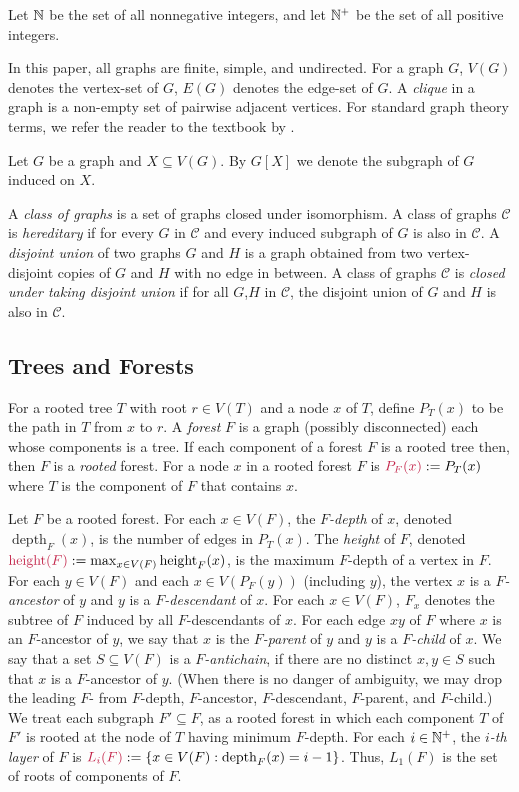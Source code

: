 \documentclass{patmorin}
\makeatletter
\newcommand{\defin}[1]{\emph{\textcolor{brightmaroon}{#1}}}
\def\mathcolor#1#{\@mathcolor{#1}}
\def\@mathcolor#1#2#3{%
  \protect\leavevmode
  \begingroup
    \color#1{#2}#3%
  \endgroup
}
\newcommand{\mathdefin}[1]{\mathcolor{brightmaroon}{#1}}
\DeclareMathOperator{\height}{height}
\DeclareMathOperator{\depth}{depth}
\newcommand{\calC}{\mathcal{C}}
\makeatother
\begin{document}
Let \defin{$\mathbb{N}$} be the set of all nonnegative integers, and let \defin{$\mathbb{N}^+$} be the set of all positive integers.

  In this paper, all graphs are finite, simple, and undirected.  For a graph $G$, \defin{$V(G)$} denotes the vertex-set of $G$, \defin{$E(G)$} denotes the edge-set of $G$.  A \defin{clique} in a graph is a non-empty set of pairwise adjacent vertices. For standard graph theory terms, we refer the reader to the textbook by \citet{diestel:graph}.

  Let $G$ be a graph and $X\subseteq V(G)$. By $G[X]$ we denote the subgraph of $G$ induced on $X$.

  A \defin{class of graphs} is a set of graphs closed under isomorphism.
  A class of graphs $\calC$ is \defin{hereditary} if for every $G$ in $\calC$ and every induced subgraph of $G$ is also in $\calC$.
  A \defin{disjoint union} of two graphs $G$ and $H$ is a graph obtained from two vertex-disjoint copies of $G$ and $H$ with no edge in between.
  A class of graphs $\calC$ is \defin{closed under taking disjoint union} if for all $G$,$H$ in $\calC$, the disjoint union of $G$ and $H$ is also in $\calC$.



  \subsection{Trees and Forests}

  For a rooted tree $T$ with root $r\in V(T)$ and a node $x$ of $T$, define \defin{$P_T(x)$} to be the path in $T$ from $x$ to $r$.    A \defin{forest} $F$ is a graph (possibly disconnected) each whose components is a tree.  If each component of a forest $F$ is a rooted tree then, then $F$ is a \defin{rooted} forest. For a node $x$ in a rooted forest $F$ is $\mathdefin{P_F(x)}:=P_T(x)$ where $T$ is the component of $F$ that contains $x$.

  Let $F$ be a rooted forest.  For each $x\in V(F)$,
  the \defin{$F$-depth} of $x$, denoted \defin{$\depth_F(x)$}, is the number of edges in $P_T(x)$.
  The \defin{height} of $F$, denoted $\mathdefin{\height(F)}:=\max_{x\in V(F)}\height_F(x)$, is the maximum $F$-depth of a vertex in $F$.
  For each $y\in V(F)$ and each $x\in V(P_F(y))$ (including $y$),  the vertex $x$ is a \defin{$F$-ancestor} of $y$ and $y$ is a \defin{$F$-descendant} of $x$.  For each $x\in V(F)$, \defin{$F_x$} denotes the subtree of $F$ induced by all $F$-descendants of $x$.
  For each edge $xy$ of $F$ where $x$ is an $F$-ancestor of $y$, we say that $x$ is the \defin{$F$-parent} of $y$ and $y$ is a \defin{$F$-child} of $x$.
  We say that a set $S\subseteq V(F)$ is a \defin{$F$-antichain}, if there are no distinct $x,y\in S$ such that $x$ is a $F$-ancestor of $y$.  (When there is no danger of ambiguity, we may drop the leading $F$- from $F$-depth, $F$-ancestor, $F$-descendant, $F$-parent, and $F$-child.)
  We treat each subgraph $F'\subseteq F$, as a rooted forest in which each component $T$ of $F'$ is rooted at the node of $T$ having minimum $F$-depth.  For each $i\in\mathbb{N}^+$, the \defin{$i$-th layer} of $F$ is $\mathdefin{L_i(F)}:=\{x\in V(F):\depth_F(x)=i-1\}$.
  Thus, $L_1(F)$ is the set of roots of components of $F$.
\end{document}
